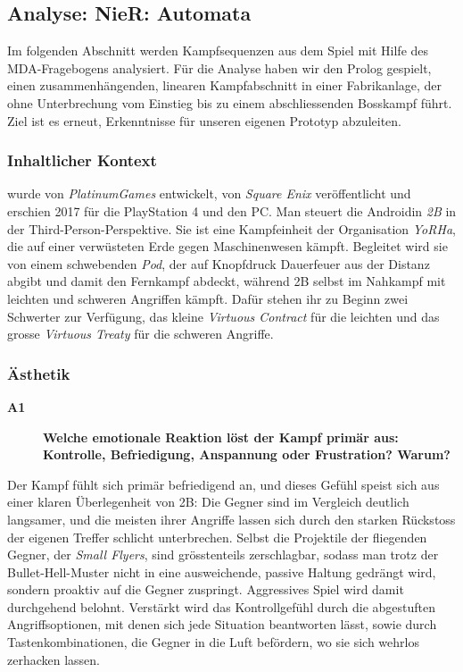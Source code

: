 \documentclass[../Main.tex]{subfiles}
\begin{document}
\subsection{Analyse: NieR: Automata} \label{sec:ReferenzspielanalyseNier}

Im folgenden Abschnitt werden Kampfsequenzen aus dem Spiel  mit Hilfe des MDA-Fragebogens analysiert. Für die Analyse haben wir den Prolog gespielt, einen zusammenhängenden, linearen Kampfabschnitt in einer Fabrikanlage, der ohne Unterbrechung vom Einstieg bis zu einem abschliessenden Bosskampf führt. Ziel ist es erneut, Erkenntnisse für unseren eigenen Prototyp abzuleiten.

\subsubsection{Inhaltlicher Kontext}

 wurde von \textit{PlatinumGames} entwickelt, von \textit{Square Enix} veröffentlicht und erschien 2017 für die PlayStation 4 und den PC.\autocite{platinumgames_nierautomata_2017} Man steuert die Androidin \textit{2B} in der Third-Person-Perspektive. Sie ist eine Kampfeinheit der Organisation \textit{YoRHa}, die auf einer verwüsteten Erde gegen Maschinenwesen kämpft. Begleitet wird sie von einem schwebenden \textit{Pod}, der auf Knopfdruck Dauerfeuer aus der Distanz abgibt und damit den Fernkampf abdeckt, während 2B selbst im Nahkampf mit leichten und schweren Angriffen kämpft. Dafür stehen ihr zu Beginn zwei Schwerter zur Verfügung, das kleine \textit{Virtuous Contract} für die leichten und das grosse \textit{Virtuous Treaty} für die schweren Angriffe.

\subsubsection{Ästhetik}

\begin{description}
    \item[\textbf{A1}] \textbf{Welche emotionale Reaktion löst der Kampf primär aus: Kontrolle, Befriedigung, Anspannung oder Frustration? Warum?}
\end{description}

Der Kampf fühlt sich primär befriedigend an, und dieses Gefühl speist sich aus einer klaren Überlegenheit von 2B: Die Gegner sind im Vergleich deutlich langsamer, und die meisten ihrer Angriffe lassen sich durch den starken Rückstoss der eigenen Treffer schlicht unterbrechen. Selbst die Projektile der fliegenden Gegner, der \textit{Small Flyers}, sind grösstenteils zerschlagbar, sodass man trotz der Bullet-Hell-Muster nicht in eine ausweichende, passive Haltung gedrängt wird, sondern proaktiv auf die Gegner zuspringt. Aggressives Spiel wird damit durchgehend belohnt. Verstärkt wird das Kontrollgefühl durch die abgestuften Angriffsoptionen, mit denen sich jede Situation beantworten lässt, sowie durch Tastenkombinationen, die Gegner in die Luft befördern, wo sie sich wehrlos zerhacken lassen.
\end{document}
